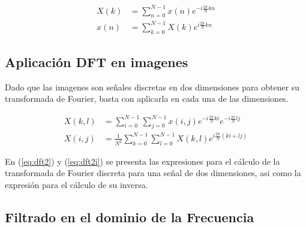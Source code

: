 \documentclass[
  letterpaper,
  twocolumn,
  9pt,
  journal,
  final]{IEEEtran}
\begin{document}
\begin{align}
	X(k) &= \sum_{n=0}^{N-1} x(n) e ^{-i \frac{2\pi}{N} k n } \label{eq:dft} \\
	x(n) &= \sum_{k=0}^{N-1} X(k) e ^{ i \frac{2\pi}{N} k n } \label{eq:dfti}
\end{align}

\subsection{Aplicación DFT en imagenes}

Dado que las imagenes son señales discretas en dos dimensiones para obtener su transformada de Fourier, basta con aplicarla en cada una de las dimensiones.

\begin{align}
	X(k,l) &= \sum_{i=0}^{N-1} \sum_{j=0}^{N-1} x(i,j) e ^ {-i \frac{2\pi}{N} k i} e ^ {-i \frac{2\pi}{N} l j} \label{eq:dft2} \\
	X(i,j) &= \frac{1}{N^2} \sum_{k=0}^{N-1} \sum_{l=0}^{N-1} X(k,l) e ^ {i \frac{2\pi}{N} (ki +lj)} \label{eq:dft2i}
\end{align}

En (\ref{eq:dft2}) y (\ref{eq:dft2i}) se presenta las expresiones para el cálculo de la transformada de Fourier discreta para una señal de dos dimensiones, asi como la expresión para el cálculo de su inversa.

\subsection{Filtrado en el dominio de la Frecuencia}


\nocite{*}


\end{document}
